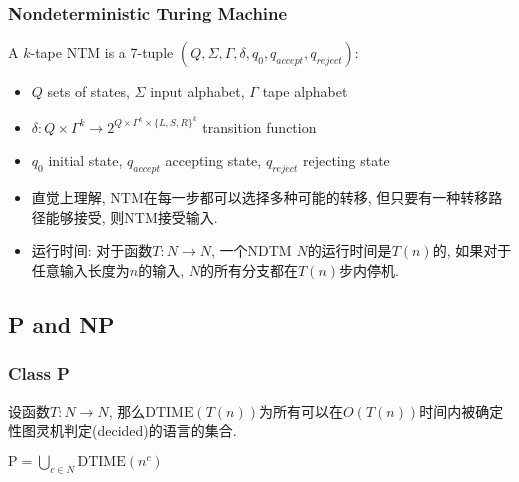 \begin{frame}
    \frametitle{Nondeterministic Turing Machine}
\begin{definition}
    A $k$-tape NTM is a 7-tuple $(Q, \Sigma, \Gamma, \delta, q_0, q_{accept}, q_{reject})$:
    \begin{itemize}
        \item $Q$ sets of states, $\Sigma$ input alphabet, $\Gamma$ tape alphabet
        \item $\delta: Q\times \Gamma^k \rightarrow 2^{Q\times \Gamma^k\times \{L,S,R\}^k}$ transition function
        \item $q_0$ initial state, $q_{accept}$ accepting state, $q_{reject}$ rejecting state
    \end{itemize}
\end{definition}
\pause
\begin{itemize}
    \item 直觉上理解, NTM在每一步都可以选择多种可能的转移, 但只要有一种转移路径能够接受, 则NTM接受输入.
    \item 运行时间: 对于函数$T: N\rightarrow N$, 一个NDTM $N$的运行时间是$T(n)$的, 如果对于任意输入长度为$n$的输入, $N$的所有分支都在$T(n)$步内停机.
\end{itemize}
\end{frame}
\subsection{P and NP}
\begin{frame}
    \frametitle{Class P}
    \begin{definition}
        设函数$T: N\rightarrow N$, 那么$\text{DTIME}(T(n))$为所有可以在$O(T(n))$时间内被确定性图灵机判定(decided)的语言的集合.
    \end{definition}
    \begin{definition}[Class P]
        $\text{P} = \bigcup_{c\in N} \text{DTIME}(n^c)$
    \end{definition}
\end{frame}

